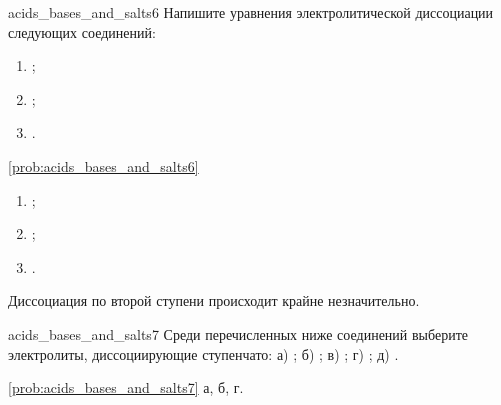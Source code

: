 \begin{problem}{}{acids_bases_and_salts6}
    Напишите уравнения электролитической диссоциации следующих соединений:
    \begin{enumerate}[label=\arabic*)]
        \item {};
        \item {};
        \item {}.
    \end{enumerate}
    \begin{sol}{\ref{prob:acids_bases_and_salts6}}
        \begin{enumerate}[label=\arabic*)]
            \item {};
            \item {};
            \item {}.
        \end{enumerate}
        Диссоциация по второй ступени происходит крайне незначительно.
    \end{sol}
\end{problem}

\begin{problem}{}{acids_bases_and_salts7}
    Среди перечисленных ниже соединений выберите электролиты, диссоциирующие ступенчато: а) ; б) ; в) ; г) ; д) .
    \begin{sol}{\ref{prob:acids_bases_and_salts7}}
        а, б, г.
    \end{sol}
\end{problem}

